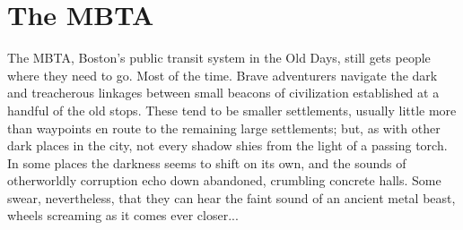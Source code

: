 \documentclass[././main.tex]{subfiles}
\begin{document}


\section{The MBTA}
The MBTA, Boston's public transit system in the Old Days, still gets people where they need to go. Most of the time. Brave adventurers navigate the dark and treacherous linkages between small beacons of civilization established at a handful of the old stops. These tend to be smaller settlements, usually little more than waypoints en route to the remaining large settlements; but, as with other dark places in the city, not every shadow shies from the light of a passing torch. In some places the darkness seems to shift on its own, and the sounds of otherworldly corruption echo down abandoned, crumbling concrete halls. Some swear, nevertheless, that they can hear the faint sound of an ancient metal beast, wheels screaming as it comes ever closer...
\end{document}
